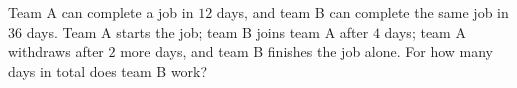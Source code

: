 Team A can complete a job in $12$ days, and team B can complete the same job in $36$ days. Team A starts the job; team B joins team A after $4$ days; team A withdraws after $2$ more days, and team B finishes the job alone. For how many days in total does team B work?
